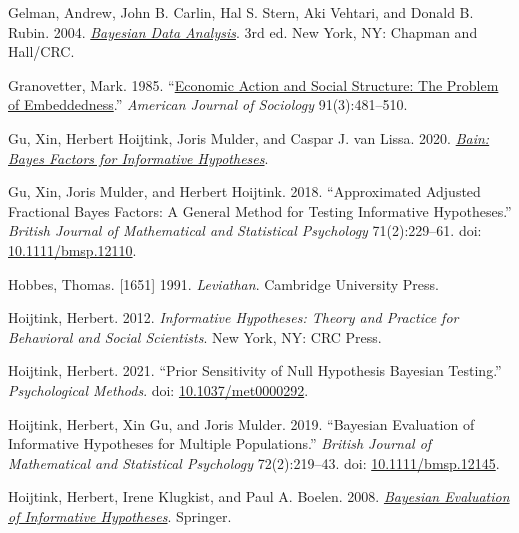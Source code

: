 \documentclass[
  11pt,
]{article}
\newlength{\cslhangindent}
\newlength{\cslentryspacingunit} %
\newenvironment{CSLReferences}[2] %
 {%
  \setlength{\parindent}{0pt}
  \ifodd #1
  \let\oldpar\par
  \def\par{\hangindent=\cslhangindent\oldpar}
  \fi
  \setlength{\parskip}{#2\cslentryspacingunit}
 }%
 {}
\begin{document}
\begin{CSLReferences}{1}{0}
\leavevmode{}%
Gelman, Andrew, John B. Carlin, Hal S. Stern, Aki Vehtari, and Donald B. Rubin. 2004. \emph{\href{https://doi.org/10.1201/b16018}{Bayesian Data Analysis}}. 3rd ed. New York, NY: {Chapman and Hall/CRC}.

\leavevmode{}%
Granovetter, Mark. 1985. {``\href{https://www.jstor.org/stable/2780199}{Economic Action and Social Structure: The Problem of Embeddedness}.''} \emph{American Journal of Sociology} 91(3):481--510.

\leavevmode{}%
Gu, Xin, Herbert Hoijtink, Joris Mulder, and Caspar J. van Lissa. 2020. \emph{\href{https://CRAN.R-project.org/package=bain}{Bain: Bayes Factors for Informative Hypotheses}}.

\leavevmode{}%
Gu, Xin, Joris Mulder, and Herbert Hoijtink. 2018. {``Approximated Adjusted Fractional Bayes Factors: A General Method for Testing Informative Hypotheses.''} \emph{British Journal of Mathematical and Statistical Psychology} 71(2):229--61. doi: \href{https://doi.org/10.1111/bmsp.12110}{10.1111/bmsp.12110}.

\leavevmode{}%
Hobbes, Thomas. {[}1651{]} 1991. \emph{Leviathan}. Cambridge University Press.

\leavevmode{}%
Hoijtink, Herbert. 2012. \emph{Informative {H}ypotheses: {T}heory and {P}ractice for {B}ehavioral and {S}ocial {S}cientists}. New York, NY: CRC Press.

\leavevmode{}%
Hoijtink, Herbert. 2021. {``Prior Sensitivity of Null Hypothesis Bayesian Testing.''} \emph{Psychological Methods}. doi: \href{https://doi.org/10.1037/met0000292}{10.1037/met0000292}.

\leavevmode{}%
Hoijtink, Herbert, Xin Gu, and Joris Mulder. 2019. {``Bayesian Evaluation of Informative Hypotheses for Multiple Populations.''} \emph{British Journal of Mathematical and Statistical Psychology} 72(2):219--43. doi: \href{https://doi.org/10.1111/bmsp.12145}{10.1111/bmsp.12145}.

\leavevmode{}%
Hoijtink, Herbert, Irene Klugkist, and Paul A. Boelen. 2008. \emph{\href{https://link.springer.com/book/10.1007/978-0-387-09612-4}{Bayesian Evaluation of Informative Hypotheses}}. Springer.


\end{CSLReferences}
\end{document}
